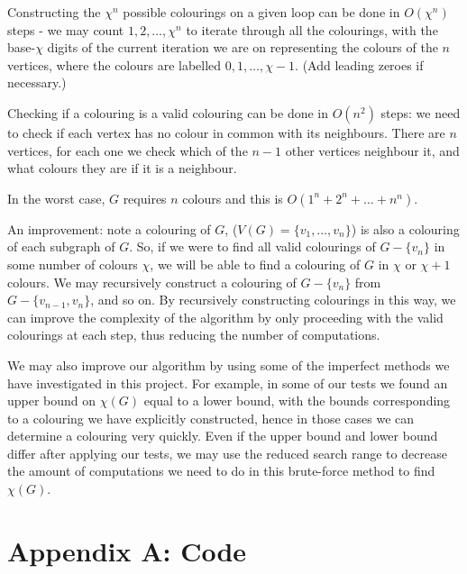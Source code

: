 \documentclass{article}
\begin{document}
Constructing the $\chi^n$ possible colourings on a given loop can be done in $O(\chi^n)$ steps - we may count $1,2,\dots, \chi^n$ to iterate through all the colourings, with the base-$\chi$ digits of the current iteration we are on representing the colours of the $n$ vertices, where the colours are labelled $0,1,\dots,\chi-1$. (Add leading zeroes if necessary.)

Checking if a colouring is a valid colouring can be done in $O(n^2)$ steps: we need to check if each vertex has no colour in common with its neighbours. There are $n$ vertices, for each one we check which of the $n-1$ other vertices neighbour it, and what colours they are if it is a neighbour.

In the worst case, $G$ requires $n$ colours and this is $O(1^n+2^n+\dots+n^n)$.

An improvement: note a colouring of $G$, ($V(G)= \{v_1, \dots, v_n\}$) is also a colouring of each subgraph of $G$. So, if we were to find all valid colourings of $G-\{v_n\}$ in some number of colours $\chi$, we will be able to find a colouring of $G$ in $\chi$ or $\chi+1$ colours. We may recursively construct a colouring of $G-\{v_n\}$ from $G-\{v_{n-1},v_n\}$, and so on. By recursively constructing colourings in this way, we can improve the complexity of the algorithm by only proceeding with the valid colourings at each step, thus reducing the number of computations.

We may also improve our algorithm by using some of the imperfect methods we have investigated in this project. For example, in some of our tests we found an upper bound on $\chi(G)$ equal to a lower bound, with the bounds corresponding to a colouring we have explicitly constructed, hence in those cases we can determine a colouring very quickly. Even if the upper bound and lower bound differ after applying our tests, we may use the reduced search range to decrease the amount of computations we need to do in this brute-force method to find $\chi(G)$.

\newpage
				




\section{Appendix A: Code}
\label{appendix_a_code}

				
\end{document}
